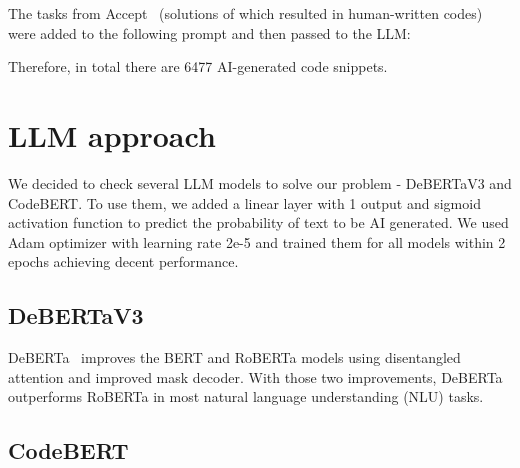 \documentclass{article}
\begin{document}
The tasks from Accept~\cite{Beresnev} (solutions of which resulted in human-written codes) were added to the following prompt and then passed to the LLM:

\medskip
{}
\medskip

Therefore, in total there are 6477 AI-generated code snippets.

\section{LLM approach}

We decided to check several LLM models to solve our problem - DeBERTaV3 and CodeBERT. To use them, we added a linear layer with 1 output and sigmoid activation function to predict the probability of text to be AI generated. We used Adam optimizer with learning rate 2e-5 and trained them for all models within 2 epochs achieving decent performance.

\subsection{DeBERTaV3}

DeBERTa~\cite{He2023} improves the BERT and RoBERTa models using disentangled attention and improved mask decoder. With those two improvements, DeBERTa outperforms RoBERTa in most natural language understanding (NLU) tasks.

\subsection{CodeBERT}
\end{document}
